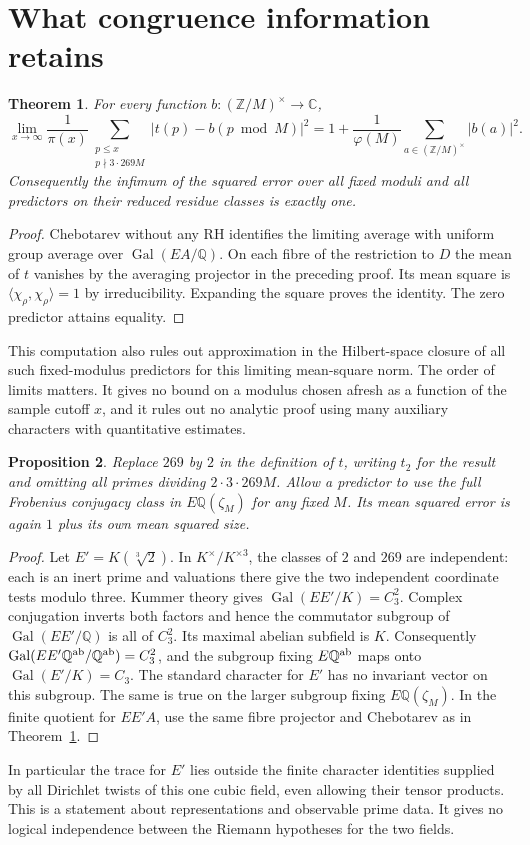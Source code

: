 \documentclass[11pt]{article}
\newtheorem{theorem}{Theorem}
\newtheorem{proposition}[theorem]{Proposition}
\newcommand{\Q}{\mathbb Q}
\newcommand{\Gal}{\operatorname{Gal}}
\begin{document}
\section{What congruence information retains}
\begin{theorem}\label{t:error}
For every function $b:(\mathbb Z/M)^\times\to\mathbb C$,
\[
\lim_{x\to\infty}\frac1{\pi(x)}
 \sum_{\substack{p\le x\\p\nmid3\cdot269M}}|t(p)-b(p\bmod M)|^2
 =1+\frac1{\varphi(M)}\sum_{a\in(\mathbb Z/M)^\times}|b(a)|^2.
\]
Consequently the infimum of the squared error over all fixed moduli
and all predictors on their reduced residue classes is exactly one.
\end{theorem}
\begin{proof}
Chebotarev without any RH identifies the limiting average with uniform
group average over $\Gal(EA/\Q)$. On each fibre of the restriction to
$D$ the mean of $t$ vanishes by the averaging projector in the preceding
proof. Its mean square is $\langle\chi_\rho,\chi_\rho\rangle=1$ by
irreducibility. Expanding the square proves the identity. The zero
predictor attains equality.
\end{proof}
This computation also rules out approximation in the Hilbert-space
closure of all such fixed-modulus predictors for this limiting mean-square
norm. The order of limits matters. It gives no bound on a modulus
chosen afresh as a function of the sample cutoff $x$, and it rules out no
analytic proof using many auxiliary characters with quantitative estimates.

\begin{proposition}\label{p:2}
Replace $269$ by $2$ in the definition of $t$, writing $t_2$ for the
result and omitting all primes dividing $2\cdot3\cdot269M$.
Allow a predictor to use the \emph{full} Frobenius conjugacy class
in $E\Q(\zeta_M)$ for any fixed $M$. Its mean squared error is again
$1$ plus its own mean squared size.
\end{proposition}
\begin{proof}
Let $E'=K(\sqrt[3]{2})$. In $K^\times/K^{\times3}$, the classes of
$2$ and $269$ are independent: each is an inert prime and valuations
there give the two independent coordinate tests modulo three. Kummer
theory gives $\Gal(EE'/K)=C_3^2$. Complex conjugation inverts both
factors and hence the commutator subgroup of $\Gal(EE'/\Q)$ is all
of $C_3^2$. Its maximal abelian subfield is $K$.
Consequently $\Gal(EE'\Q^{\rm ab}/\Q^{\rm ab})=C_3^2$, and
the subgroup fixing $E\Q^{\rm ab}$ maps onto $\Gal(E'/K)=C_3$.
The standard character for $E'$ has no invariant vector on this
subgroup. The same is true on the larger subgroup fixing $E\Q(\zeta_M)$.
In the finite quotient for $EE'A$, use the same fibre projector and
Chebotarev as in Theorem~\ref{t:error}.
\end{proof}
In particular the trace for $E'$ lies outside the finite character
identities supplied by all Dirichlet twists of this one cubic field,
even allowing their tensor products. This is a statement about
representations and observable prime data. It gives no logical
independence between the Riemann hypotheses for the two fields.
\end{document}

